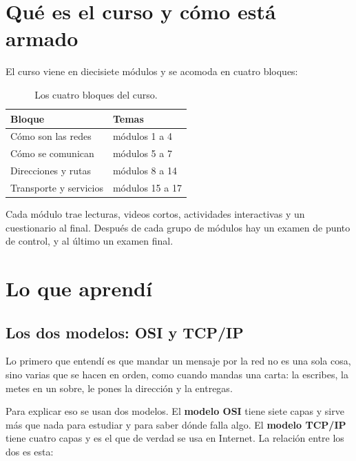 \documentclass[11pt,a4paper]{article}
\begin{document}
\section{Qué es el curso y cómo está armado}

El curso viene en diecisiete módulos y se acomoda en cuatro bloques:

\begin{table}[htbp]
  \centering
  \small
  \begin{tabular}{@{}ll@{}}
    \toprule
    \textbf{Bloque} & \textbf{Temas} \\ \midrule
    Cómo son las redes & módulos 1 a 4 \\
    Cómo se comunican & módulos 5 a 7 \\
    Direcciones y rutas & módulos 8 a 14 \\
    Transporte y servicios & módulos 15 a 17 \\ \bottomrule
  \end{tabular}
  \caption{Los cuatro bloques del curso.}
  \label{tab:bloques}
\end{table}

Cada módulo trae lecturas, videos cortos, actividades interactivas y un
cuestionario al final. Después de cada grupo de módulos hay un examen de punto
de control, y al último un examen final.

\section{Lo que aprendí}

\subsection{Los dos modelos: OSI y TCP/IP}

Lo primero que entendí es que mandar un mensaje por la red no es una sola cosa,
sino varias que se hacen en orden, como cuando mandas una carta: la escribes,
la metes en un sobre, le pones la dirección y la entregas.

Para explicar eso se usan dos modelos. El \textbf{modelo OSI} tiene siete capas
y sirve más que nada para estudiar y para saber dónde falla algo. El
\textbf{modelo TCP/IP} tiene cuatro capas y es el que de verdad se usa en
Internet. La relación entre los dos es esta:
\end{document}
